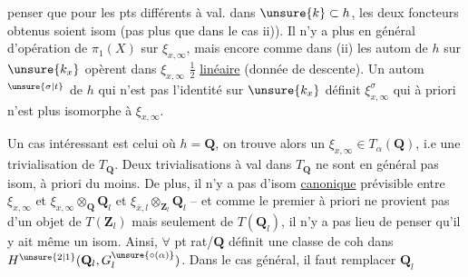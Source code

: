 penser que pour les pts différents à val. dans $\unsure{k}\subset h$, les deux foncteurs obtenus soient isom (pas plus que dans le cas ii)). Il n'y a plus en général d'opération de $\pi_1(X)$ sur $\xi_{x,\infty}$, mais encore comme dans (ii) les autom de $h$ sur $\unsure{k_x}$ opèrent dans $\xi_{x,\infty}$ $\frac12$ \uline{linéaire} (donnée de descente). Un autom$^{\unsure{\sigma|t}}$ de $h$ qui n'est pas l'identité sur $\unsure{k_x}$ définit $\xi_{x,\infty}^{\sigma}$ qui à priori n'est plus isomorphe à $\xi_{x,\infty}$.

Un cas intéressant est celui où $h=\mathbf Q$, on trouve alors un  $\xi_{x,\infty}\in T_\alpha(\mathbf Q)$, i.e une trivialisation de $T_{\mathbf Q}$. Deux trivialisations à val dans $T_{\mathbf Q}$ ne sont en général pas isom, à priori du moins. De plus, il n'y a pas d'isom \uline{canonique} prévisible entre $\xi_{x,\infty}$ et $\xi_{x,\infty}\otimes_{\mathbf Q}\mathbf Q_l$ et $\xi_{\bar x,l}\otimes_{\mathbf Z_l}\mathbf Q_l$ --  et comme le premier à priori ne provient pas d'un objet de $T(\mathbf Z_l)$ mais seulement de $T(\mathbf Q_l)$, il n'y a pas lieu de penser qu'il y ait même un isom. Ainsi, $\forall$ pt rat/$\mathbf Q$ définit une classe de coh dans $H^{\unsure{2|1}}(\mathbf Q_l,G_l^{\unsure{\circ(\alpha)}})$. Dans le cas général, il faut remplacer $\mathbf Q_l$



